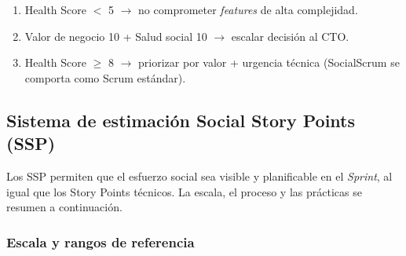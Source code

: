 \begin{enumerate}
    \item Health Score $<$ 5 $\rightarrow$ no comprometer \textit{features} de alta complejidad.
    \item Valor de negocio 10 + Salud social 10 $\rightarrow$ escalar decisión al CTO.
    \item Health Score $\geq$ 8 $\rightarrow$ priorizar por valor + urgencia técnica (SocialScrum se comporta como Scrum estándar).
\end{enumerate}

\subsection{Sistema de estimación Social Story Points (SSP)}

Los SSP permiten que el esfuerzo social sea visible y planificable en el \textit{Sprint}, al igual que los Story Points técnicos. La escala, el proceso y las prácticas se resumen a continuación.

\subsubsection{Escala y rangos de referencia}

\begingroup
\scriptsize
\renewcommand{\arraystretch}{1.4}
\setlength{\tabcolsep}{4pt}
\setlength{\LTleft}{0pt}
\setlength{\LTright}{0pt}


